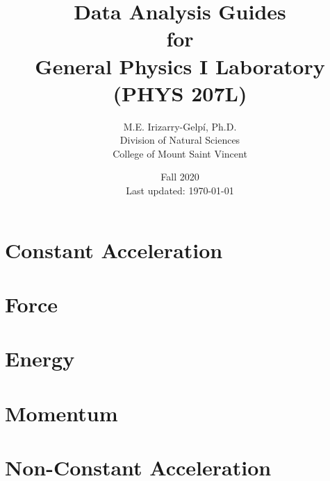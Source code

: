 \documentclass[letterpaper,12pt]{report}
\begin{document}
%
\title{\Huge{Data Analysis Guides \\ for \\ General Physics I Laboratory \\ (PHYS 207L)}}
\author{M.E. Irizarry-Gelp\'{i}, Ph.D. \\ Division of Natural Sciences \\ College of Mount Saint Vincent}
\date{Fall 2020 \\ Last updated: {\today} {\currenttime}}
%
\maketitle
\tableofcontents
%

%
\setcounter{part}{0}
\part{Constant Acceleration}
%


%
\setcounter{part}{1}
\part{Force}
%



%
\setcounter{part}{2}
\part{Energy}
%

%
\setcounter{part}{3}
\part{Momentum}
%


%
\setcounter{part}{4}
\part{Non-Constant Acceleration}
%


%
\appendix
%



%
\end{document}
